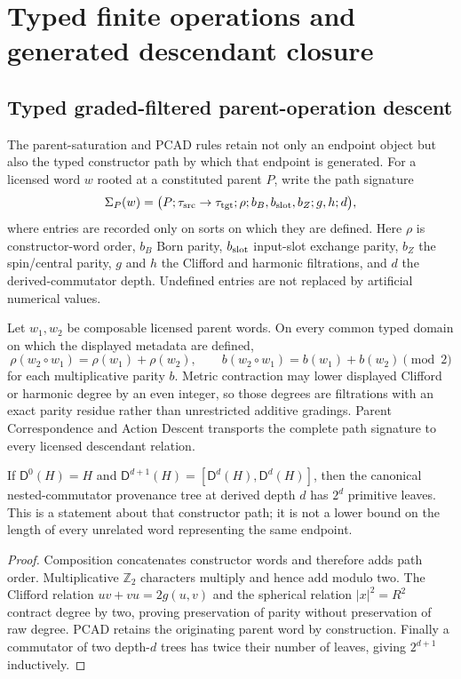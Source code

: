 \documentclass[12pt,a4paper]{article}
\begin{document}
\section{Typed finite operations and generated descendant closure}
\label{paper2a:sec:organized-applications}

\subsection{Typed graded-filtered parent-operation descent}
\label{p2a:sec:v189-graded-filtered-parent-operations}
The parent-saturation and PCAD rules retain not only an endpoint object but
also the typed constructor path by which that endpoint is generated.  For a
licensed word $w$ rooted at a constituted parent $P$, write the path signature
\[
 \Sigma_P(w)=
 \bigl(P;\tau_{\rm src}\to\tau_{\rm tgt};\rho;
 b_B,b_{\rm slot},b_Z;g,h;d\bigr),
\]
where entries are recorded only on sorts on which they are defined.  Here
$\rho$ is constructor-word order, $b_B$ Born parity, $b_{\rm slot}$ input-slot
exchange parity, $b_Z$ the spin/central parity, $g$ and $h$ the Clifford and
harmonic filtrations, and $d$ the derived-commutator depth.  Undefined entries
are not replaced by artificial numerical values.

\begin{theorem}
\label{p2a:thm:v189-graded-filtered-pcad}
Let $w_1,w_2$ be composable licensed parent words.  On every common typed
domain on which the displayed metadata are defined,
\[
 \rho(w_2\circ w_1)=\rho(w_1)+\rho(w_2),
 \qquad
 b(w_2\circ w_1)=b(w_1)+b(w_2)\pmod2
\]
for each multiplicative parity $b$.  Metric contraction may lower displayed
Clifford or harmonic degree by an even integer, so those degrees are
filtrations with an exact parity residue rather than unrestricted additive
gradings.  Parent Correspondence and Action Descent transports the complete
path signature to every licensed descendant relation.

If $\mathsf D^0(H)=H$ and
$\mathsf D^{d+1}(H)=[\mathsf D^d(H),\mathsf D^d(H)]$, then the canonical
nested-commutator provenance tree at derived depth $d$ has $2^d$ primitive
leaves.  This is a statement about that constructor path; it is not a lower
bound on the length of every unrelated word representing the same endpoint.
\end{theorem}

\begin{proof}
Composition concatenates constructor words and therefore adds path order.
Multiplicative $\mathbb Z_2$ characters multiply and hence add modulo two.
The Clifford relation $uv+vu=2g(u,v)$ and the spherical relation
$|x|^2=R^2$ contract degree by two, proving preservation of parity without
preservation of raw degree.  PCAD retains the originating parent word by
construction.  Finally a commutator of two depth-$d$ trees has twice their
number of leaves, giving $2^{d+1}$ inductively.
\end{proof}
\end{document}

